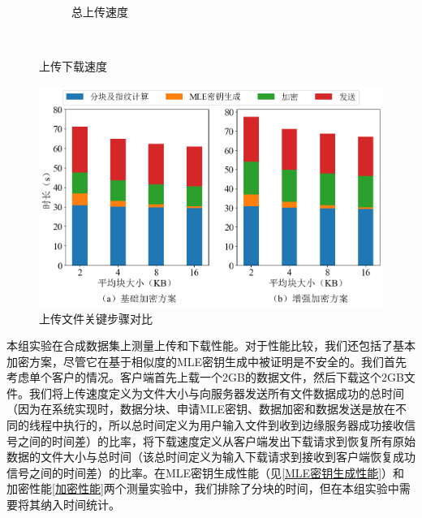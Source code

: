 \documentclass[promaster]{thesis-uestc}
\begin{document}
\begin{figure}[h]
\begin{subfigure}{0.40\textwidth}
        \centering
        \captionsetup{width=\textwidth}
        \caption{总上传速度}
        \label{上传下载速度4}
    \end{subfigure}\\
    \caption{上传下载速度}
    \label{上传下载速度}
\end{figure}

\begin{figure}[ht]
    \centering
    \includegraphics[width = 0.90\linewidth]{pic/basic_enhanced_ratio.png}
    \caption{上传文件关键步骤对比}
    \label{上传文件关键步骤对比}
\end{figure}
本组实验在合成数据集上测量上传和下载性能。对于性能比较，我们还包括了基本加密方案，尽管它在基于相似度的MLE密钥生成中被证明是不安全的。我们首先考虑单个客户的情况。客户端首先上载一个2GB的数据文件，然后下载这个2GB文件。我们将上传速度定义为文件大小与向服务器发送所有文件数据成功的总时间（因为在系统实现时，数据分块、申请MLE密钥、数据加密和数据发送是放在不同的线程中执行的，所以总时间定义为用户输入文件到收到边缘服务器成功接收信号之间的时间差）的比率，将下载速度定义从客户端发出下载请求到恢复所有原始数据的文件大小与总时间（该总时间定义为输入下载请求到接收到客户端恢复成功信号之间的时间差）的比率。在MLE密钥生成性能（见\ref{MLE密钥生成性能}）和加密性能\ref{加密性能}两个测量实验中，我们排除了分块的时间，但在本组实验中需要将其纳入时间统计。
\end{document}
